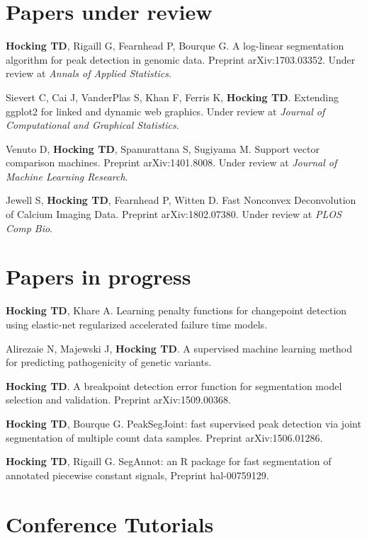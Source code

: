 \documentclass[margin,line]{res}
\begin{document}
\begin{resume}
\section{\sc Papers under review}

{\bf Hocking TD}, Rigaill G, Fearnhead P, Bourque G. A log-linear
segmentation algorithm for peak detection in genomic data. Preprint
arXiv:1703.03352. Under review at {\it Annals of Applied Statistics}.

Sievert C, Cai J, VanderPlas S, Khan F, Ferris K, {\bf Hocking
  TD}. Extending ggplot2 for linked and dynamic web graphics. Under
review at {\it Journal of Computational and Graphical Statistics}.

Venuto D, {\bf Hocking TD}, Spanurattana S, Sugiyama M. Support vector
comparison machines. Preprint arXiv:1401.8008. Under review at {\it
  Journal of Machine Learning Research}.

Jewell S, {\bf Hocking TD}, Fearnhead P, Witten D. Fast Nonconvex
Deconvolution of Calcium Imaging Data. Preprint
arXiv:1802.07380. Under review at {\it PLOS Comp Bio}.

\section{\sc Papers in progress}

{\bf Hocking TD}, Khare A. Learning penalty functions for changepoint
detection using elastic-net regularized accelerated failure time
models.


Alirezaie N, Majewski J, {\bf Hocking TD}. A supervised machine
learning method for predicting pathogenicity of genetic variants.

{\bf Hocking TD}. A breakpoint detection error function for
segmentation model selection and validation. Preprint
arXiv:1509.00368.

{\bf Hocking TD}, Bourque G. PeakSegJoint: fast supervised peak
detection via joint segmentation of multiple count data
samples. Preprint arXiv:1506.01286.

{\bf Hocking TD}, Rigaill G. SegAnnot: an R package for fast
segmentation of annotated piecewise constant signals, Preprint
hal-00759129.

\section{\sc Conference Tutorials}


\end{resume}
\end{document}
